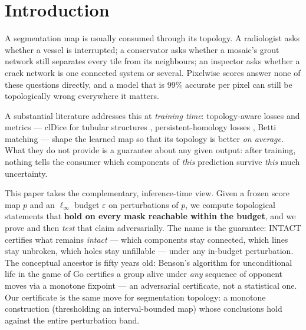 \documentclass[10pt]{article}
\newcommand{\eps}{\varepsilon}
\begin{document}
\section{Introduction}\label{sec:intro}

A segmentation map is usually consumed through its topology. A radiologist
asks whether a vessel is interrupted; a conservator asks whether a mosaic's
grout network still separates every tile from its neighbours; an inspector
asks whether a crack
network is one connected system or several. Pixelwise scores answer none
of these questions directly, and a model that is 99\% accurate per pixel
can still be topologically wrong everywhere it matters.

A substantial literature addresses this at \emph{training time}:
topology-aware losses and metrics --- clDice for tubular structures
\citep{shit2021cldice}, persistent-homology losses
\citep{hu2019topo,clough2020topological}, Betti matching
\citep{stucki2023betti} --- shape the learned map so that its topology is
better \emph{on average}. What they do not provide is a guarantee about
any given output: after training, nothing tells the consumer which
components of \emph{this} prediction survive \emph{this} much uncertainty.

This paper takes the complementary, inference-time view. Given a frozen
score map $p$ and an $\ell_\infty$ budget $\eps$ on perturbations of $p$,
we compute topological statements that \textbf{hold on every mask
reachable within the budget},
and we prove and then \emph{test} that claim adversarially. The name is
the guarantee: INTACT certifies what remains \emph{intact} --- which
components stay connected, which lines stay unbroken, which holes stay
unfillable --- under any in-budget perturbation. The conceptual
ancestor is fifty years old: Benson's algorithm for unconditional life in
the game of Go \citep{benson1976} certifies a group alive under \emph{any}
sequence of opponent moves via a monotone fixpoint --- an adversarial
certificate, not a statistical one. Our certificate is the same move for
segmentation topology: a monotone construction (thresholding an
interval-bounded map) whose conclusions hold against the entire
perturbation band.
\end{document}
